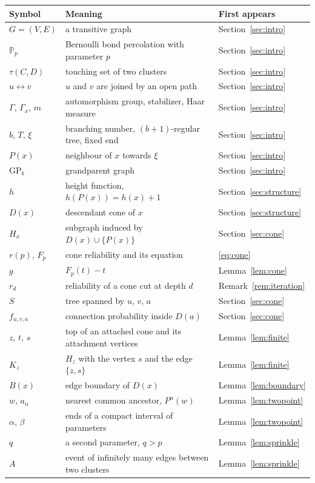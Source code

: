 \documentclass[11pt]{amsart}
\theoremstyle{remark}
\newcommand{\PP}{\mathbb{P}}
\newcommand{\GP}{\mathrm{GP}_b}
\begin{document}
\begin{center}
\begin{tabular}{p{3.0cm}p{8.0cm}p{3.1cm}}
\toprule
Symbol & Meaning & First appears\\
\midrule
$G=(V,E)$ & a transitive graph & Section~\ref{sec:intro}\\
$\PP_p$ & Bernoulli bond percolation with parameter $p$ & Section~\ref{sec:intro}\\
$\tau(C,D)$ & touching set of two clusters & Section~\ref{sec:intro}\\
$u\leftrightarrow v$ & $u$ and $v$ are joined by an open path & Section~\ref{sec:intro}\\
$\Gamma$, $\Gamma_x$, $m$ & automorphism group, stabilizer, Haar measure & Section~\ref{sec:intro}\\
$b$, $T$, $\xi$ & branching number, $(b+1)$-regular tree, fixed end & Section~\ref{sec:intro}\\
$P(x)$ & neighbour of $x$ towards $\xi$ & Section~\ref{sec:intro}\\
$\GP$ & grandparent graph & Section~\ref{sec:intro}\\
$h$ & height function, $h(P(x))=h(x)+1$ & Section~\ref{sec:structure}\\
$D(x)$ & descendant cone of $x$ & Section~\ref{sec:structure}\\
$H_x$ & subgraph induced by $D(x)\cup\{P(x)\}$ & Section~\ref{sec:cone}\\
$r(p)$, $F_p$ & cone reliability and its equation & \eqref{eq:cone}\\
$g$ & $F_p(t)-t$ & Lemma~\ref{lem:cone}\\
$r_d$ & reliability of a cone cut at depth $d$ & Remark~\ref{rem:iteration}\\
$S$ & tree spanned by $u$, $v$, $a$ & Section~\ref{sec:cone}\\
$f_{u,v,a}$ & connection probability inside $D(a)$ & Section~\ref{sec:cone}\\
$z$, $t$, $s$ & top of an attached cone and its attachment vertices & Lemma~\ref{lem:finite}\\
$K_z$ & $H_z$ with the vertex $s$ and the edge $\{z,s\}$ & Lemma~\ref{lem:finite}\\
$B(x)$ & edge boundary of $D(x)$ & Lemma~\ref{lem:boundary}\\
$w$, $a_n$ & nearest common ancestor, $P^n(w)$ & Lemma~\ref{lem:twopoint}\\
$\alpha$, $\beta$ & ends of a compact interval of parameters & Lemma~\ref{lem:twopoint}\\
$q$ & a second parameter, $q>p$ & Lemma~\ref{lem:sprinkle}\\
$A$ & event of infinitely many edges between two clusters & Lemma~\ref{lem:sprinkle}\\
\bottomrule
\end{tabular}
\end{center}
\end{document}
